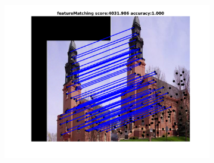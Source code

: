 \documentclass[
	fontsize=12pt,
	paper=a4,
	twoside=false,
	numbers=noenddot,
	plainheadsepline,
	toc=listof,
	toc=bibliography
]{scrartcl}
\begin{document}
\begin{figure}[h]
\begin{subfigure}[b]{0.33\textwidth}
		\includegraphics[scale=0.25]{"fig_ver2608/RealImages/ImgTrafo/no_descr/using_cpd_afftrafo/fi_4_featureMatching"} 
	\end{subfigure} 	


\end{figure}
\end{document}
